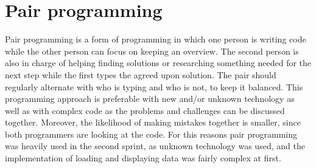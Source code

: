 \section{Pair programming}
Pair programming \cite{pairprogramming-url} is a form of programming in which one person is writing code while the other person can focus on keeping an overview. The second person is also in charge of helping finding solutions or researching something needed for the next step while the first types the agreed upon solution. The pair should regularly alternate with who is typing and who is not, to keep it balanced. This programming approach is preferable with new and/or unknown technology as well as with complex code as the problems and challenges can be discussed together. Moreover, the likelihood of making mistakes together is smaller, since both programmers are looking at the code. For this reasons pair programming was heavily used in the second sprint, as unknown technology was used, and the implementation of loading and displaying data was fairly complex at first. 

